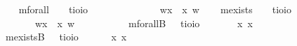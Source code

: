 \begin{isabellebody}
\isamarkuptrue%
\ \ \isamarkupfalse%
\ mforall\ \ \ {\isacharcolon}{\isacharcolon}\ {\isachardoublequoteopen}{\isacharparenleft}{\isacharprime}t{\isasymRightarrow}io{\isacharparenright}{\isasymRightarrow}io{\isachardoublequoteclose}\ {\isacharparenleft}{\isachardoublequoteopen}\isactrlbold {\isasymforall}{\isachardoublequoteclose}{\isacharparenright}\ \ \ \ \ \ \isanewline
\ \ \ \ \ {\isachardoublequoteopen}\isactrlbold {\isasymforall}{\isasymPhi}\ {\isasymequiv}\ {\isasymlambda}w{\isachardot}{\isasymforall}x{\isachardot}\ {\isacharparenleft}{\isasymPhi}\ x\ w{\isacharparenright}{\isachardoublequoteclose}\isanewline
\ \ \isamarkupfalse%
\ mexists\ \ \ {\isacharcolon}{\isacharcolon}\ {\isachardoublequoteopen}{\isacharparenleft}{\isacharprime}t{\isasymRightarrow}io{\isacharparenright}{\isasymRightarrow}io{\isachardoublequoteclose}\ {\isacharparenleft}{\isachardoublequoteopen}\isactrlbold {\isasymexists}{\isachardoublequoteclose}{\isacharparenright}\ \isanewline
\ \ \ \ \ {\isachardoublequoteopen}\isactrlbold {\isasymexists}{\isasymPhi}\ {\isasymequiv}\ {\isasymlambda}w{\isachardot}{\isasymexists}x{\isachardot}\ {\isacharparenleft}{\isasymPhi}\ x\ w{\isacharparenright}{\isachardoublequoteclose}\isanewline
\ \ \ \ \ \ \isanewline
\ \ \isamarkupfalse%
\ mforallB\ \ {\isacharcolon}{\isacharcolon}\ {\isachardoublequoteopen}{\isacharparenleft}{\isacharprime}t{\isasymRightarrow}io{\isacharparenright}{\isasymRightarrow}io{\isachardoublequoteclose}\ {\isacharparenleft}\ %
\isanewline
\ \ \ \ \ {\isachardoublequoteopen}\isactrlbold {\isasymforall}x{\isachardot}\ {\isasymphi}{\isacharparenleft}x{\isacharparenright}\ {\isasymequiv}\ \isactrlbold {\isasymforall}{\isasymphi}{\isachardoublequoteclose}\ \ \isanewline
\ \ \isamarkupfalse%
\ mexistsB\ \ {\isacharcolon}{\isacharcolon}\ {\isachardoublequoteopen}{\isacharparenleft}{\isacharprime}t{\isasymRightarrow}io{\isacharparenright}{\isasymRightarrow}io{\isachardoublequoteclose}\ {\isacharparenleft}\isanewline
\ \ \ \ \ {\isachardoublequoteopen}\isactrlbold {\isasymexists}x{\isachardot}\ {\isasymphi}{\isacharparenleft}x{\isacharparenright}\ {\isasymequiv}\ \isactrlbold {\isasymexists}{\isasymphi}{\isachardoublequoteclose}%

\end{isabellebody}
